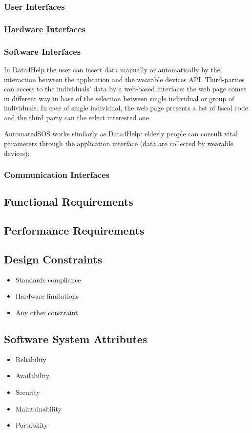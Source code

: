 \documentclass{article}
\begin{document}
	\subsubsection{User Interfaces} 
	\subsubsection{Hardware Interfaces}
	\subsubsection{Software Interfaces}
	
	In Data4Help the user can insert data manually or 
	automatically by the interaction between the application 
	and the wearable devices API. 
	Third-parties can access to the individuals’ data by a 
	web-based  interface: the web page comes in different way
	in base of the selection between single individual or 
	group of individuals. 
	In case of single individual, the web page presents a
	list of fiscal code and the third party can the select
	interested one. 
	
	AutomatedSOS works similarly as Data4Help: elderly people can
	consult vital parameters through the application interface (data
	are collected by wearable devices);
	
	\subsubsection{Communication Interfaces}
	
\subsection{Functional Requirements}	

\subsection{Performance Requirements}
\subsection{Design Constraints}
		\begin{itemize}
			\item Standards compliance
			\item Hardware limitations
			\item Any other constraint
		\end{itemize}
\subsection{Software System Attributes}	
		\begin{itemize}
			\item Reliability
			\item Availability
			\item Security
			\item Maintainability
			\item Portability
		\end{itemize}
		
\end{document}
